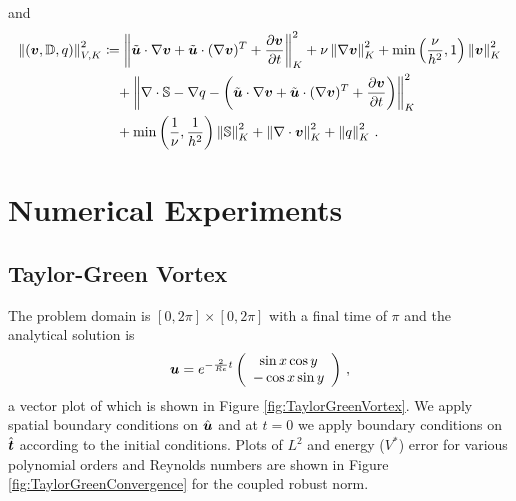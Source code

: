 \documentclass[Dissertation.tex]{subbIles}
\begin{document}
and
\begin{align*}
\left\| \left( \boldsymbol v,\mathbb{D},q \right) \right\|_{V,K}^2 &\coloneqq
\left\| \tilde{\boldsymbol u}\cdot\nabla\boldsymbol v +\tilde{\boldsymbol u}\cdot(\nabla\boldsymbol v)^T+\frac{\partial\boldsymbol v}{\partial t} \right\|_K^2
+ \nu\left\| \nabla\boldsymbol v \right\|_K^2
+ \min\left( \frac{\nu}{h^2},1 \right)\left\| \boldsymbol v \right\|^2_K
\\\nonumber&\quad
+ \left\| \nabla\cdot\mathbb{S}-\nabla q-\left( \tilde{\boldsymbol u}\cdot\nabla\boldsymbol v +\tilde{\boldsymbol u}\cdot(\nabla\boldsymbol v)^T+\frac{\partial\boldsymbol v}{\partial t} \right) \right\|_K^2
\\\nonumber&\quad
+ \min\left( \frac{1}{\nu},\frac{1}{h^2} \right)\left\| \mathbb{S} \right\|_K^2
+\left\| \nabla\cdot\boldsymbol v \right\|_K^2
+\left\| q \right\|_K^2
\,.
\end{align*}

\section{Numerical Experiments}
\subsection{Taylor-Green Vortex}
The problem domain is $[0,2\pi]\times[0,2\pi]$ with a final time of $\pi$ and the analytical solution is 
\[
\boldsymbol u=e^{-\frac{2}{Re}t}\left( \begin{array}{c} \sin{x}\cos{y}\\ -\cos{x}\sin{y}\\ \end{array} \right)\,,
\]
a vector plot of which is shown in Figure \ref{fig:TaylorGreenVortex}.
We apply spatial boundary conditions on $\hat{\boldsymbol u}$ and at $t=0$ we apply boundary conditions
on $\hat{\boldsymbol t}$ according to the initial conditions.
Plots of $L^2$ and energy ($V^*$) error for various polynomial orders and Reynolds numbers are shown
in Figure \ref{fig:TaylorGreenConvergence} for the coupled robust norm.
\end{document}
